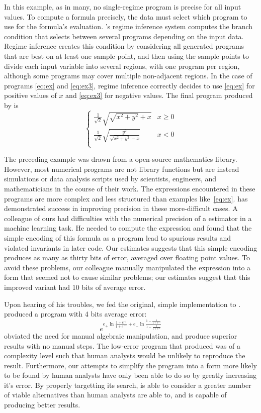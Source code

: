 \documentclass[paper.tex]{subfiles}
\begin{document}
In this example, as in many,
  no single-regime program is precise for all input values.
To compute a formula precisely, the data must select
  which program to use for the formula's evaluation.
\casio's regime inference system
  computes the branch condition
  that selects between several programs depending on the input data.
Regime inference creates this condition
  by considering all generated programs
  that are best on at least one sample point,
  and then using the sample points to divide each input variable
  into several regions, with one program per region,
  although some programs may cover multiple non-adjacent regions.
In the case of programs \eqref{eq:ex} and \eqref{eq:ex3},
  regime inference correctly decides
  to use \eqref{eq:ex} for positive values of $x$
  and \eqref{eq:ex3} for negative values.
The final program produced by \casio is
\[
\begin{cases}
  \frac1{\sqrt2} \sqrt{\sqrt{x^2 + y^2} + x} & x \ge 0 \\
  \frac1{\sqrt2} \sqrt{\frac{y^2}{\sqrt{x^2 + y^2} - x}} & x < 0 \\
\end{cases}
\]

The preceding example was drawn from a open-source mathematics library.
However, most numerical programs are not library functions
  but are instead simulations or data analysis scripts
  used by scientists, engineers, and mathematicians
  in the course of their work.
The expressions encountered in these programs are more complex
  and less structured than examples like~\eqref{eq:ex}.
\casio has demonstrated success in improving precision
  in these more-difficult cases.
A colleague of ours had difficulties with the numerical precision
  of a estimator in a machine learning task.
He needed to compute the expression
  and found that the simple encoding of this formula as a program
  lead to spurious results and violated invariants in later code.
Our estimates suggests that this simple encoding produces
  as many as thirty bits of error, averaged over floating point values.
To avoid these problems,
  our colleague manually manipulated the expression
  into a form that seemed not to cause similar problems;
  our estimates suggest that this improved variant
  had 10 bits of average error.

Upon hearing of his troubles,
  we fed the original, simple implementation to \casio.
\casio produced a program with 4 bits average error:
  \begin{equation}
  e^{e_+\ln{\frac{1+e^{-t}}{1+e^{-s}}} +
     e_-\ln{\frac{1-\frac{1}{1+e^{-s}}}
                 {1-\frac{1}{1+e^{-t}}}}}
  \end{equation}
\casio obviated the need for manual algebraic manipulation,
  and produce superior results with no manual steps.
The low-error program that \casio produced was of a complexity level
  such that human analysts would be unlikely to reproduce the result. 
Furthermore, our attempts to simplify the program
  into a form more likely to be found by human analysts
  have only been able to do so by greatly increasing it's error.
By properly targetting its search,
  \casio is able to consider a greater number of viable alternatives
  than human analysts are able to,
  and is capable of producing better results.
\end{document}
